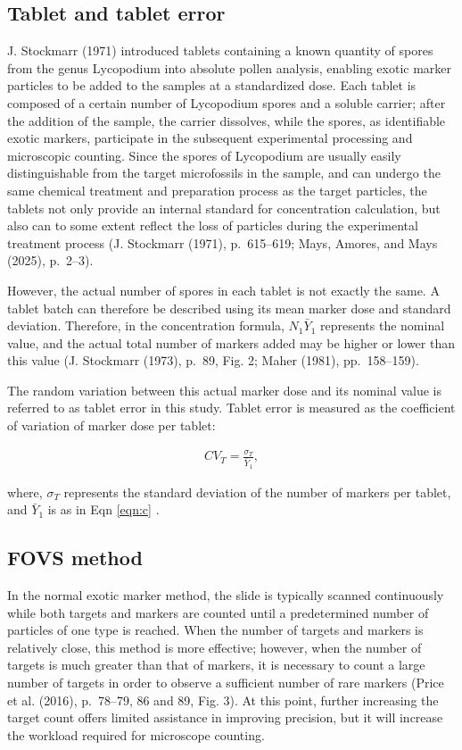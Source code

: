\documentclass[
  12pt,
]{article}
\begin{document}
\subsection{Tablet and tablet error}\label{tablet-and-tablet-error}

J. Stockmarr (1971) introduced tablets containing a known quantity of
spores from the genus Lycopodium into absolute pollen analysis, enabling
exotic marker particles to be added to the samples at a standardized
dose. Each tablet is composed of a certain number of Lycopodium spores
and a soluble carrier; after the addition of the sample, the carrier
dissolves, while the spores, as identifiable exotic markers, participate
in the subsequent experimental processing and microscopic counting.
Since the spores of Lycopodium are usually easily distinguishable from
the target microfossils in the sample, and can undergo the same chemical
treatment and preparation process as the target particles, the tablets
not only provide an internal standard for concentration calculation, but
also can to some extent reflect the loss of particles during the
experimental treatment process (J. Stockmarr (1971), p.~615--619; Mays,
Amores, and Mays (2025), p.~2--3).

However, the actual number of spores in each tablet is not exactly the
same. A tablet batch can therefore be described using its mean marker
dose and standard deviation. Therefore, in the concentration formula,
\(N_1\bar{Y}_1\) represents the nominal value, and the actual total
number of markers added may be higher or lower than this value (J.
Stockmarr (1973), p.~89, Fig. 2; Maher (1981), pp.~158--159).

The random variation between this actual marker dose and its nominal
value is referred to as tablet error in this study. Tablet error is
measured as the coefficient of variation of marker dose per tablet:

\begin{align}
\label{eqn:CVT} CV_T = \frac{\sigma_T}{\bar{Y}_1},
\end{align}

where, \(\sigma_T\) represents the standard deviation of the number of
markers per tablet, and \(\bar{Y}_1\) is as in Eqn \eqref{eqn:c} .

\subsection{FOVS method}\label{fovs-method}

In the normal exotic marker method, the slide is typically scanned
continuously while both targets and markers are counted until a
predetermined number of particles of one type is reached. When the
number of targets and markers is relatively close, this method is more
effective; however, when the number of targets is much greater than that
of markers, it is necessary to count a large number of targets in order
to observe a sufficient number of rare markers (Price et al. (2016),
p.~78--79, 86 and 89, Fig. 3). At this point, further increasing the
target count offers limited assistance in improving precision, but it
will increase the workload required for microscope counting.
\end{document}
